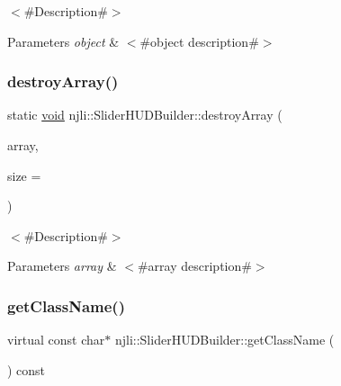 $<$\#\+Description\#$>$


\begin{DoxyParams}{Parameters}
{\em object} & $<$\#object description\#$>$ \\
\hline
\end{DoxyParams}
\mbox{\label{classnjli_1_1_slider_h_u_d_builder_aeeb254844ebeff53f2d4415e0b92d58f}} 
\subsubsection{\texorpdfstring{destroy\+Array()}{destroyArray()}}
{\footnotesize\ttfamily static \mbox{\hyperlink{_thread_8h_af1e856da2e658414cb2456cb6f7ebc66}{void}} njli\+::\+Slider\+H\+U\+D\+Builder\+::destroy\+Array (\begin{DoxyParamCaption}\item[{\mbox{\hyperlink{classnjli_1_1_slider_h_u_d_builder}{Slider\+H\+U\+D\+Builder}} $\ast$$\ast$}]{array,  }\item[{const \mbox{\hyperlink{_util_8h_a10e94b422ef0c20dcdec20d31a1f5049}{u32}}}]{size = {} }\end{DoxyParamCaption})\hspace{0.3cm}{\ttfamily [static]}}

$<$\#\+Description\#$>$


\begin{DoxyParams}{Parameters}
{\em array} & $<$\#array description\#$>$ \\
\hline
\end{DoxyParams}
\mbox{\label{classnjli_1_1_slider_h_u_d_builder_ad290f966d4e75c073125443cee217c23}} 
\subsubsection{\texorpdfstring{get\+Class\+Name()}{getClassName()}}
{\footnotesize\ttfamily virtual const char$\ast$ njli\+::\+Slider\+H\+U\+D\+Builder\+::get\+Class\+Name (\begin{DoxyParamCaption}{ }\end{DoxyParamCaption}) const\hspace{0.3cm}{\ttfamily [virtual]}}

